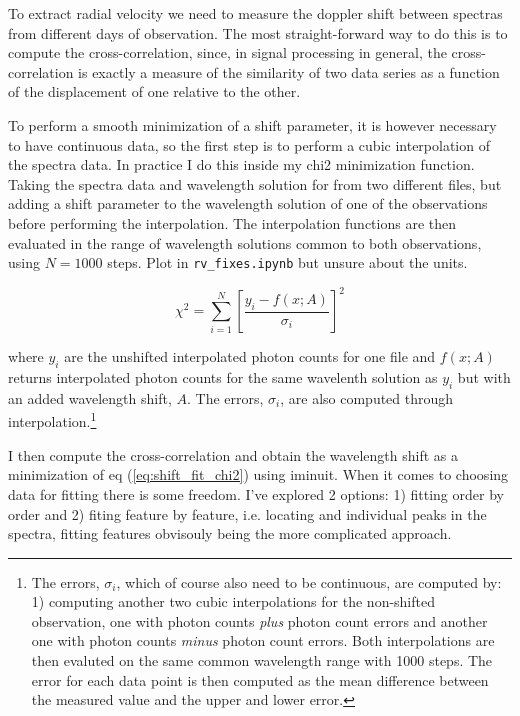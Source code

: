     To extract radial velocity we need to measure the doppler shift between spectras from different days of observation. The most straight-forward way to do this is to compute the cross-correlation, since, in signal processing in general, the cross-correlation is exactly a measure of the similarity of two data series as a function of the displacement of one relative to the other.

    To perform a smooth minimization of a shift parameter, it is however necessary to have continuous data, so the first step is to perform a cubic interpolation of the spectra data. In practice I do this inside my chi2 minimization function. Taking the spectra data and wavelength solution for from two different files, but adding a shift parameter to the wavelength solution of one of the observations before performing the interpolation. The interpolation functions are then evaluated in the range of wavelength solutions common to both observations, using $N=1000$ steps.  Plot in \verb|rv_fixes.ipynb| but unsure about the units.
    
    \begin{equation}
        \label{eq:shift_fit_chi2}
        \chi^{2}=\sum_{i=1}^{N}\left[\frac{y_{i}-f(x; A)}{\sigma_{i}}\right]^{2}
    \end{equation}
    
    where $y_i$ are the unshifted interpolated photon counts for one file and $f(x; A)$ returns interpolated photon counts for the same wavelenth solution as $y_i$ but with an added wavelength shift, $A$. The errors, $\sigma_i$, are also computed through interpolation.\footnote{The errors, $\sigma_i$, which of course also need to be continuous, are computed by: 1) computing another two cubic interpolations for the non-shifted observation, one with photon counts \emph{plus} photon count errors and another one with photon counts \emph{minus} photon count errors. Both interpolations are then evaluted on the same common wavelength range with 1000 steps. The error for each data point is then computed as the mean difference between the measured value and the upper and lower error.}
    
    I then compute the cross-correlation and obtain the wavelength shift as a minimization of eq (\ref{eq:shift_fit_chi2}) using iminuit. When it comes to choosing data for fitting there is some freedom. I've explored 2 options: 1) fitting order by order and 2) fiting feature by feature, i.e. locating and individual peaks in the spectra, fitting features obvisouly being the more complicated approach. 
    
